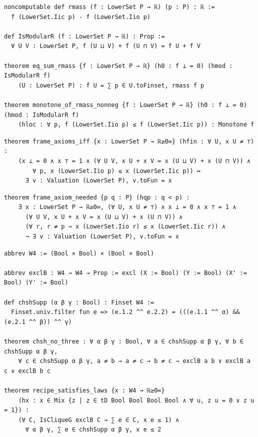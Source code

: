 \label{lean:eq-sum-rmass}
\begin{lstlisting}
noncomputable def rmass (f : LowerSet P → ℝ) (p : P) : ℝ :=
  f (LowerSet.Iic p) - f (LowerSet.Iio p)

def IsModularR (f : LowerSet P → ℝ) : Prop :=
  ∀ U V : LowerSet P, f (U ⊔ V) + f (U ⊓ V) = f U + f V

theorem eq_sum_rmass {f : LowerSet P → ℝ} (h0 : f ⊥ = 0) (hmod : IsModularR f)
    (U : LowerSet P) : f U = ∑ p ∈ U.toFinset, rmass f p

theorem monotone_of_rmass_nonneg {f : LowerSet P → ℝ} (h0 : f ⊥ = 0) (hmod : IsModularR f)
    (hloc : ∀ p, f (LowerSet.Iio p) ≤ f (LowerSet.Iic p)) : Monotone f
\end{lstlisting}

\label{lean:frame-axioms}
\begin{lstlisting}
theorem frame_axioms_iff {x : LowerSet P → ℝ≥0∞} (hfin : ∀ U, x U ≠ ⊤) :
    (x ⊥ = 0 ∧ x ⊤ = 1 ∧ (∀ U V, x U + x V = x (U ⊔ V) + x (U ⊓ V)) ∧
        ∀ p, x (LowerSet.Iio p) ≤ x (LowerSet.Iic p)) ↔
      ∃ v : Valuation (LowerSet P), v.toFun = x
\end{lstlisting}

\label{lean:frame-axiom-needed}
\begin{lstlisting}
theorem frame_axiom_needed {p q : P} (hqp : q < p) :
    ∃ x : LowerSet P → ℝ≥0∞, (∀ U, x U ≠ ⊤) ∧ x ⊥ = 0 ∧ x ⊤ = 1 ∧
      (∀ U V, x U + x V = x (U ⊔ V) + x (U ⊓ V)) ∧
      (∀ r, r ≠ p → x (LowerSet.Iio r) ≤ x (LowerSet.Iic r)) ∧
      ¬ ∃ v : Valuation (LowerSet P), v.toFun = x
\end{lstlisting}

\label{lean:second-order-laws}
\begin{lstlisting}
abbrev W4 := (Bool × Bool) × (Bool × Bool)

abbrev exclB : W4 → W4 → Prop := excl (X := Bool) (Y := Bool) (X' := Bool) (Y' := Bool)

def chshSupp (α β γ : Bool) : Finset W4 :=
  Finset.univ.filter fun e => (e.1.2 ^^ e.2.2) = (((e.1.1 ^^ α) && (e.2.1 ^^ β)) ^^ γ)

theorem chsh_no_three : ∀ α β γ : Bool, ∀ a ∈ chshSupp α β γ, ∀ b ∈ chshSupp α β γ,
    ∀ c ∈ chshSupp α β γ, a ≠ b → a ≠ c → b ≠ c → exclB a b ∨ exclB a c ∨ exclB b c

theorem recipe_satisfies_laws {x : W4 → ℝ≥0∞}
    (hx : x ∈ Mix {z | z ∈ tD Bool Bool Bool Bool ∧ ∀ u, z u = 0 ∨ z u = 1}) :
    (∀ C, IsCliqueG exclB C → ∑ e ∈ C, x e ≤ 1) ∧
      ∀ α β γ, ∑ e ∈ chshSupp α β γ, x e ≤ 2
\end{lstlisting}

